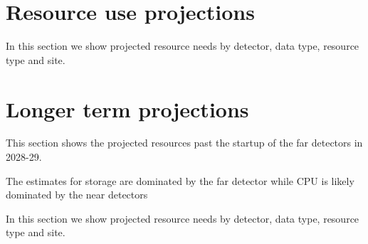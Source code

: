 \documentclass[12pt]{article}
\begin{document}
\section{Resource use projections}

In this section we show projected resource needs by detector, data type, resource type and site.




















\section{Longer term projections}

This section shows the projected resources past the startup of the far detectors in 2028-29. 

The estimates for storage are dominated by the far detector while CPU is likely dominated by the near detectors

In this section we show projected resource needs by detector, data type, resource type and site.







\end{document}
